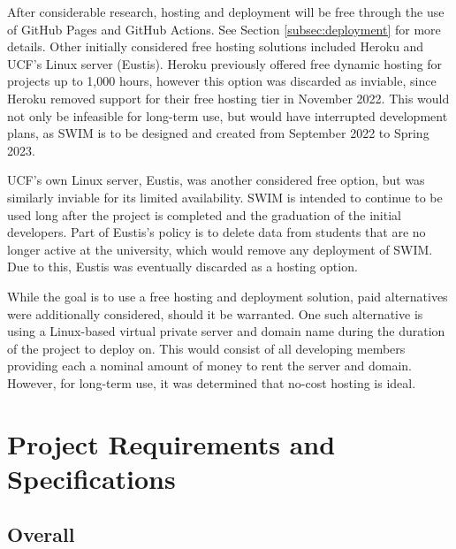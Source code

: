 \documentclass[
    paper=letter,
    parskip=half,
    fontsize=12pt,
    titlepage=firstiscover,
    toc=bibliography,
    numbers=endperiod
]{scrartcl}
\let\oldsection\section
\renewcommand{\section}{\newpage\oldsection}
\begin{document}
After considerable research, hosting and deployment will be free through the use of GitHub Pages and GitHub Actions. See Section \ref{subsec:deployment} for more details. Other initially considered free hosting solutions included Heroku and UCF's Linux server (Eustis).  Heroku previously offered free dynamic hosting for projects up to 1,000 hours, however this option was discarded as inviable, since Heroku removed support for their free hosting tier in November 2022. This would not only be infeasible for long-term use, but would have interrupted development plans, as SWIM is to be designed and created from September 2022 to Spring 2023.

UCF's own Linux server, Eustis, was another considered free option, but was similarly inviable for its limited availability. SWIM is intended to continue to be used long after the project is completed and the graduation of the initial developers. Part of Eustis's policy is to delete data from students that are no longer active at the university, which would remove any deployment of SWIM. Due to this, Eustis was eventually discarded as a hosting option.

While the goal is to use a free hosting and deployment solution, paid alternatives were additionally considered, should it be warranted. One such alternative is using a Linux-based virtual private server and domain name during the duration of the project to deploy on. This would consist of all developing members providing each a nominal amount of money to rent the server and domain. However, for long-term use, it was determined that no-cost hosting is ideal.


\section{Project Requirements and Specifications}
\subsection{Overall}
\end{document}

